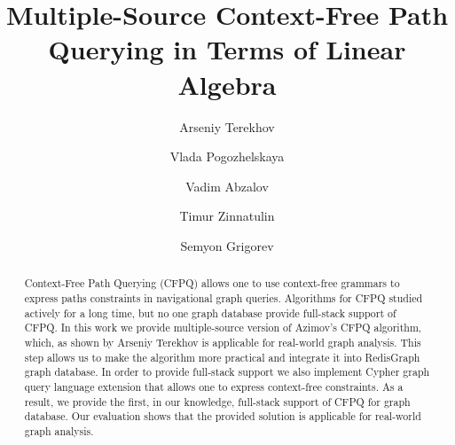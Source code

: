 \documentclass[sigconf,edbt,table]{acmart-edbt2021}
\begin{document}
\title{Multiple-Source Context-Free Path Querying in Terms of Linear Algebra}
  


\author{Arseniy Terekhov}

\author{Vlada Pogozhelskaya}

\author{Vadim Abzalov}

\author{Timur Zinnatulin}

\author{Semyon Grigorev}

\renewcommand{\shortauthors}{Arseniy Terekhov et al.}


\begin{abstract}
Context-Free Path Querying (CFPQ) allows one to use context-free grammars to express paths constraints in navigational graph queries. 
Algorithms for CFPQ studied actively for a long time, but no one graph database provide full-stack support of CFPQ. 
In this work we provide multiple-source version of Azimov's CFPQ algorithm, which, as shown by Arseniy Terekhov is applicable for real-world graph analysis.
This step allows us to make the algorithm more practical and integrate it into RedisGraph graph database. 
In order to provide full-stack support we also implement Cypher graph query language extension that allows one to express context-free constraints. 
As a result, we provide the first, in our knowledge, full-stack support of CFPQ for graph database.
Our evaluation shows that the provided solution is applicable for real-world graph analysis.
\end{abstract}
\end{document}
